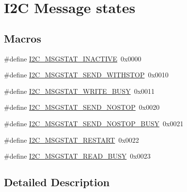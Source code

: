 \hypertarget{group__msg_states}{\section{I2\-C Message states}
\label{group__msg_states}
}
\subsection*{Macros}
\begin{DoxyCompactItemize}
\item 
\#define \hyperlink{group__msg_states_gad7ff7f3ddb5fb35b633d558b376cf329}{I2\-C\-\_\-\-M\-S\-G\-S\-T\-A\-T\-\_\-\-I\-N\-A\-C\-T\-I\-V\-E}~0x0000
\item 
\#define \hyperlink{group__msg_states_ga56f7eeab5c8dbbe042a10d1f8ac1ad55}{I2\-C\-\_\-\-M\-S\-G\-S\-T\-A\-T\-\_\-\-S\-E\-N\-D\-\_\-\-W\-I\-T\-H\-S\-T\-O\-P}~0x0010
\item 
\#define \hyperlink{group__msg_states_ga36809495e97c0e8033246b227f9716be}{I2\-C\-\_\-\-M\-S\-G\-S\-T\-A\-T\-\_\-\-W\-R\-I\-T\-E\-\_\-\-B\-U\-S\-Y}~0x0011
\item 
\#define \hyperlink{group__msg_states_ga6b46589e75a5bfdc3c57b0bc30cc8671}{I2\-C\-\_\-\-M\-S\-G\-S\-T\-A\-T\-\_\-\-S\-E\-N\-D\-\_\-\-N\-O\-S\-T\-O\-P}~0x0020
\item 
\#define \hyperlink{group__msg_states_gadbe18b39fde045ed6d51eaa7e17b78e0}{I2\-C\-\_\-\-M\-S\-G\-S\-T\-A\-T\-\_\-\-S\-E\-N\-D\-\_\-\-N\-O\-S\-T\-O\-P\-\_\-\-B\-U\-S\-Y}~0x0021
\item 
\#define \hyperlink{group__msg_states_gadf5a3e5950b5af97d3ec2e40b96c2251}{I2\-C\-\_\-\-M\-S\-G\-S\-T\-A\-T\-\_\-\-R\-E\-S\-T\-A\-R\-T}~0x0022
\item 
\#define \hyperlink{group__msg_states_ga9bd9503fa86f5b4d52aeb21be008064a}{I2\-C\-\_\-\-M\-S\-G\-S\-T\-A\-T\-\_\-\-R\-E\-A\-D\-\_\-\-B\-U\-S\-Y}~0x0023
\end{DoxyCompactItemize}


\subsection{Detailed Description}


